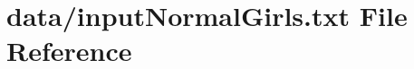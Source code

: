 \hypertarget{inputNormalGirls_8txt}{}\section{data/input\+Normal\+Girls.txt File Reference}
\label{inputNormalGirls_8txt}
